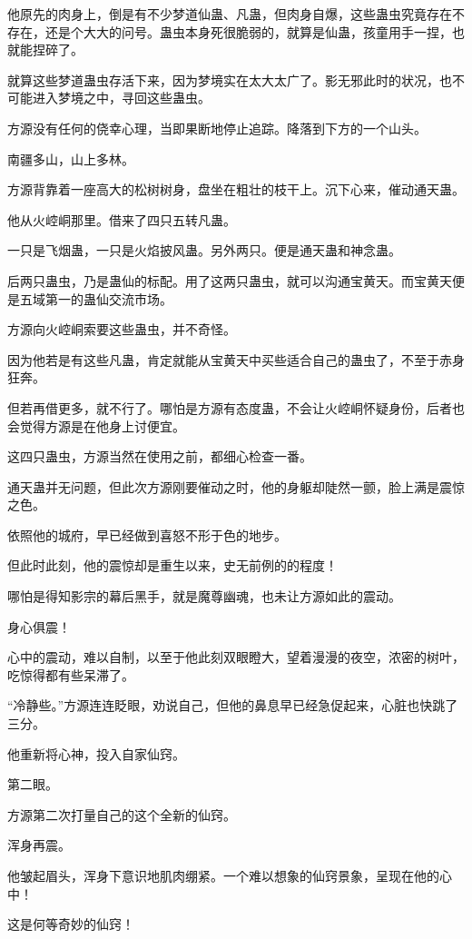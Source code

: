 \begin{this_body}
他原先的肉身上，倒是有不少梦道仙蛊、凡蛊，但肉身自爆，这些蛊虫究竟存在不存在，还是个大大的问号。蛊虫本身死很脆弱的，就算是仙蛊，孩童用手一捏，也就能捏碎了。

就算这些梦道蛊虫存活下来，因为梦境实在太大太广了。影无邪此时的状况，也不可能进入梦境之中，寻回这些蛊虫。

方源没有任何的侥幸心理，当即果断地停止追踪。降落到下方的一个山头。

南疆多山，山上多林。

方源背靠着一座高大的松树树身，盘坐在粗壮的枝干上。沉下心来，催动通天蛊。

他从火崆峒那里。借来了四只五转凡蛊。

一只是飞烟蛊，一只是火焰披风蛊。另外两只。便是通天蛊和神念蛊。

后两只蛊虫，乃是蛊仙的标配。用了这两只蛊虫，就可以沟通宝黄天。而宝黄天便是五域第一的蛊仙交流市场。

方源向火崆峒索要这些蛊虫，并不奇怪。

因为他若是有这些凡蛊，肯定就能从宝黄天中买些适合自己的蛊虫了，不至于赤身狂奔。

但若再借更多，就不行了。哪怕是方源有态度蛊，不会让火崆峒怀疑身份，后者也会觉得方源是在他身上讨便宜。

这四只蛊虫，方源当然在使用之前，都细心检查一番。

通天蛊并无问题，但此次方源刚要催动之时，他的身躯却陡然一颤，脸上满是震惊之色。

依照他的城府，早已经做到喜怒不形于色的地步。

但此时此刻，他的震惊却是重生以来，史无前例的的程度！

哪怕是得知影宗的幕后黑手，就是魔尊幽魂，也未让方源如此的震动。

身心俱震！

心中的震动，难以自制，以至于他此刻双眼瞪大，望着漫漫的夜空，浓密的树叶，吃惊得都有些呆滞了。

“冷静些。”方源连连眨眼，劝说自己，但他的鼻息早已经急促起来，心脏也快跳了三分。

他重新将心神，投入自家仙窍。

第二眼。

方源第二次打量自己的这个全新的仙窍。

浑身再震。

他皱起眉头，浑身下意识地肌肉绷紧。一个难以想象的仙窍景象，呈现在他的心中！

这是何等奇妙的仙窍！


\end{this_body}
